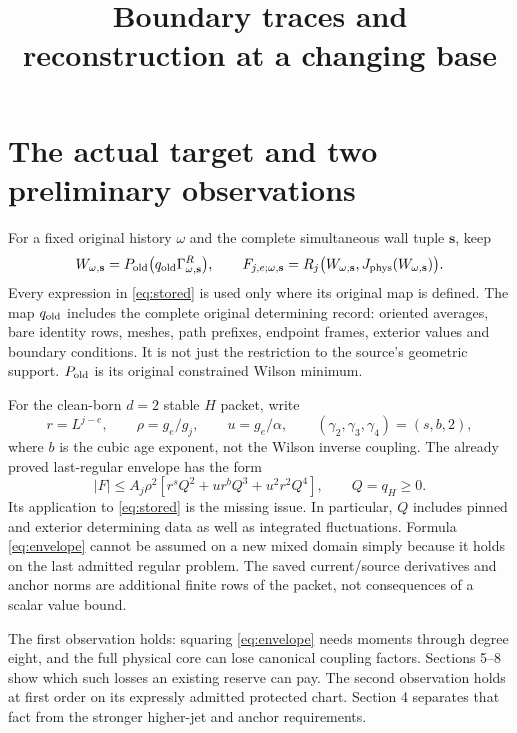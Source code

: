 \documentclass[11pt,letterpaper]{article}
\title{Boundary traces and reconstruction at a changing base}\author{}\date{}
\numberwithin{equation}{section}
\theoremstyle{plain}
\theoremstyle{remark}\newtheorem{remark}[theorem]{Scope}
\begin{document}
\maketitle
\section{The actual target and two preliminary observations}

For a fixed original history $\omega$ and the complete simultaneous wall
tuple $\mathbf s$, keep
\begin{equation}
 W_{\omega,\mathbf s}
 =P_{\rm old}\bigl(q_{\rm old}\Gamma^R_{\omega,\mathbf s}\bigr),
 \qquad
 F_{j,e;\omega,\mathbf s}
 =R_j\bigl(W_{\omega,\mathbf s},J_{\rm phys}(W_{\omega,\mathbf s})\bigr).
 \label{eq:stored}
\end{equation}
Every expression in \eqref{eq:stored} is used only where its original map
is defined. The map $q_{\rm old}$ includes the complete original determining
record: oriented averages, bare identity rows, meshes, path prefixes,
endpoint frames, exterior values and boundary conditions. It is not just
the restriction to the source's geometric support. $P_{\rm old}$ is its
original constrained Wilson minimum.

For the clean-born $d=2$ stable $H$ packet, write
\begin{equation}
 r=L^{j-e},\qquad \rho=g_e/g_j,\qquad u=g_e/\alpha,
 \qquad (\gamma_2,\gamma_3,\gamma_4)=(s,b,2),
 \label{eq:notation}
\end{equation}
where $b$ is the cubic age exponent, not the Wilson inverse coupling.
The already proved last-regular envelope has the form
\begin{equation}
 |F|\le A_j\rho^2
 \left[r^sQ^2+ur^bQ^3+u^2r^2Q^4\right],\qquad Q=q_H\ge0.
 \label{eq:envelope}
\end{equation}
Its application to \eqref{eq:stored} is the missing issue. In particular,
$Q$ includes pinned and exterior determining data as well as integrated
fluctuations. Formula \eqref{eq:envelope} cannot be assumed on a new mixed
domain simply because it holds on the last admitted regular problem.
The saved current/source derivatives and anchor norms are additional
finite rows of the packet, not consequences of a scalar value bound.

The first observation holds: squaring
\eqref{eq:envelope} needs moments through degree eight, and the full physical
core can lose canonical coupling factors. Sections 5--8 show which such
losses an existing reserve can pay. The second observation holds at first
order on its expressly admitted protected chart. Section 4 separates that
fact from the stronger higher-jet and anchor requirements.
\end{document}
